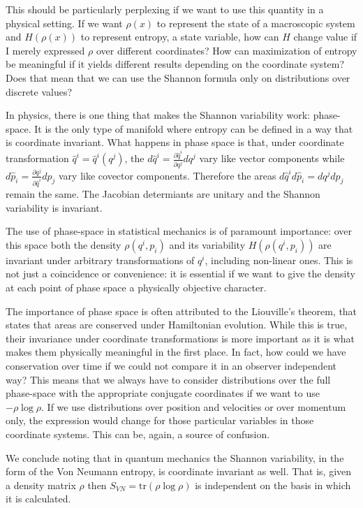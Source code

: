 \documentclass{article}
\begin{document}
This should be particularly perplexing if we want to use this quantity in a physical setting. If we want $\rho(x)$ to represent the state of a macroscopic system and $H(\rho(x))$ to represent entropy, a state variable, how can $H$ change value if I merely expressed $\rho$ over different coordinates? How can maximization of entropy be meaningful if it yields different results depending on the coordinate system? Does that mean that we can use the Shannon formula only on distributions over discrete values?

In physics, there is one thing that makes the Shannon variability work: phase-space. It is the only type of manifold where entropy can be defined in a way that is coordinate invariant. What happens in phase space is that, under coordinate transformation $\hat{q}^i = \hat{q}^i(q^j)$, the $d\hat{q}^i = \frac{\partial \hat{q}^i}{\partial q^j } dq^j$ vary like vector components while $d\hat{p}_i = \frac{\partial q^j}{\partial \hat{q}^i } dp_j$ vary like covector components. Therefore the areas $d\hat{q}^i d\hat{p}_i = dq^j dp_j$ remain the same. The Jacobian determiants are unitary and the Shannon variability is invariant.

The use of phase-space in statistical mechanics is of paramount importance: over this space both the density $\rho(q^i, p
_i)$ and its variability $H(\rho(q^i, p
_i))$ are invariant under arbitrary transformations of $q^i$, including non-linear ones. This is not just a coincidence or convenience: it is essential if we want to give the density at each point of phase space a physically objective character.

The importance of phase space is often attributed to the Liouville's theorem, that states that areas are conserved under Hamiltonian evolution. While this is true, their invariance under coordinate transformations is more important as it is what makes them physically meaningful in the first place. In fact, how could we have conservation over time if we could not compare it in an observer independent way? This means that we always have to consider distributions over the full phase-space with the appropriate conjugate coordinates if we want to use $-\rho \log \rho$. If we use distributions over position and velocities or over momentum only, the expression would change for those particular variables in those coordinate systems. This can be, again, a source of confusion.\cite{Dunkel}


We conclude noting that in quantum mechanics the Shannon variability, in the form of the Von Neumann entropy, is coordinate invariant as well. That is, given a density matrix $\rho$ then $S_{VN} = \textrm{tr}(\rho \log \rho)$ is independent on the basis in which it is calculated.
\end{document}

